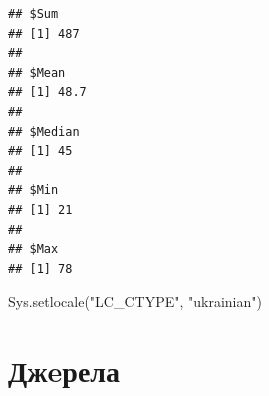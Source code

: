 \documentclass[
]{book}
\newenvironment{Shaded}{\begin{snugshade}}{\end{snugshade}}
\newcommand{\ControlFlowTok}[1]{\textcolor[rgb]{0.13,0.29,0.53}{\textbf{#1}}}
\newcommand{\FunctionTok}[1]{\textcolor[rgb]{0.00,0.00,0.00}{#1}}
\newcommand{\NormalTok}[1]{#1}
\newcommand{\OtherTok}[1]{\textcolor[rgb]{0.56,0.35,0.01}{#1}}
\newcommand{\SpecialCharTok}[1]{\textcolor[rgb]{0.00,0.00,0.00}{#1}}
\newcommand{\StringTok}[1]{\textcolor[rgb]{0.31,0.60,0.02}{#1}}
\begin{document}
\begin{Shaded}
\end{Shaded}

\begin{verbatim}
## $Sum
## [1] 487
## 
## $Mean
## [1] 48.7
## 
## $Median
## [1] 45
## 
## $Min
## [1] 21
## 
## $Max
## [1] 78
\end{verbatim}

\begin{Shaded}
\begin{Highlighting}[]
\FunctionTok{Sys.setlocale}\NormalTok{(}\StringTok{"LC\_CTYPE"}\NormalTok{, }\StringTok{"ukrainian"}\NormalTok{)}
\end{Highlighting}
\end{Shaded}

\hypertarget{ux434ux436eux440ux435ux43bux430}{%
\chapter*{Джeрела}\label{ux434ux436eux440ux435ux43bux430}}

  
\end{document}
